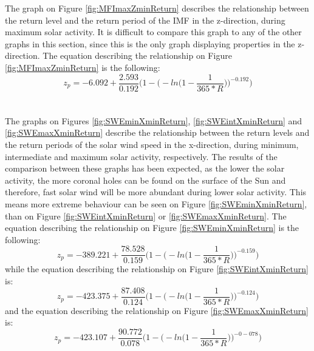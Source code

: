 \documentclass[11pt]{article}
\begin{document}
        The graph on Figure \ref{fig:MFImaxZminReturn} describes the relationship between the return level and the return period of the IMF in the z-direction, during maximum solar activity. It is difficult to compare this graph to any of the other graphs in this section, since this is the only graph displaying properties in the z-direction. The equation describing the relationship on Figure \ref{fig:MFImaxZminReturn} is the following:
        \begin{equation}
            z_p = -6.092+\frac{2.593}{0.192}\Bigg( 1-\Bigg( -ln\Bigg( 1-\frac{1}{365*R}\Bigg) \Bigg) ^{-0.192}\Bigg)
        \end{equation}\\ \\
        The graphs on Figures \ref{fig:SWEminXminReturn}, \ref{fig:SWEintXminReturn} and \ref{fig:SWEmaxXminReturn} describe the relationship between the return levels and the return periods of the solar wind speed in the x-direction, during minimum, intermediate and maximum solar activity, respectively. The results of the comparison between these graphs has been expected, as the lower the solar activity, the more coronal holes can be found on the surface of the Sun and therefore, fast solar wind will be more abundant during lower solar activity. This means more extreme behaviour can be seen on Figure \ref{fig:SWEminXminReturn}, than on Figure \ref{fig:SWEintXminReturn} or \ref{fig:SWEmaxXminReturn}. The equation describing the relationship on Figure \ref{fig:SWEminXminReturn} is the following:
        \begin{equation}
            z_p = -389.221+\frac{78.528}{0.159}\Bigg( 1-\Bigg( -ln\Bigg( 1-\frac{1}{365*R}\Bigg) \Bigg) ^{-0.159}\Bigg)
        \end{equation}
        while the equation describing the relationship on Figure \ref{fig:SWEintXminReturn} is:
        \begin{equation}
            z_p = -423.375+\frac{87.408}{0.124}\Bigg( 1-\Bigg( -ln\Bigg( 1-\frac{1}{365*R}\Bigg) \Bigg) ^{-0.124}\Bigg)
        \end{equation}
        and the equation describing the relationship on Figure \ref{fig:SWEmaxXminReturn} is:
        \begin{equation}
            z_p = -423.107+\frac{90.772}{0.078}\Bigg( 1-\Bigg( -ln\Bigg( 1-\frac{1}{365*R}\Bigg) \Bigg) ^{-0-078}\Bigg)
        \end{equation}
\end{document}
